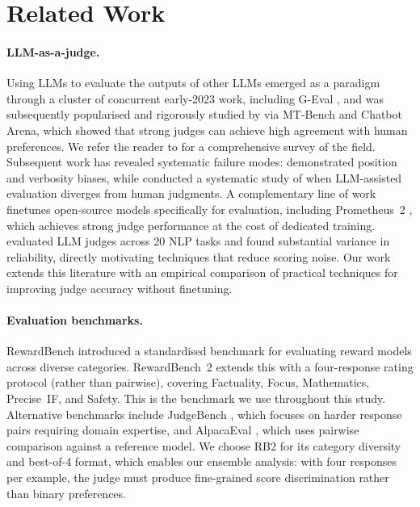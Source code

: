 \documentclass{article}
\begin{document}
\section{Related Work}
\label{sec:related-work}

\paragraph{LLM-as-a-judge.} Using LLMs to evaluate the outputs of other LLMs emerged as a paradigm through a cluster of concurrent early-2023 work, including G-Eval \citep{liu2023geval}, and was subsequently popularised and rigorously studied by \citet{zheng2023judging} via MT-Bench and Chatbot Arena, which showed that strong judges can achieve high agreement with human preferences. We refer the reader to \citet{gu2024survey} for a comprehensive survey of the field. Subsequent work has revealed systematic failure modes: \citet{wang2024large} demonstrated position and verbosity biases, while \citet{shankar2024validates} conducted a systematic study of when LLM-assisted evaluation diverges from human judgments. A complementary line of work finetunes open-source models specifically for evaluation, including Prometheus~2 \citep{kim2024prometheus}, which achieves strong judge performance at the cost of dedicated training. \citet{bavaresco2025judgebench} evaluated LLM judges across 20 NLP tasks and found substantial variance in reliability, directly motivating techniques that reduce scoring noise. Our work extends this literature with an empirical comparison of practical techniques for improving judge accuracy without finetuning.

\paragraph{Evaluation benchmarks.} RewardBench \citep{lambert2025rewardbench} introduced a standardised benchmark for evaluating reward models across diverse categories. RewardBench~2 \citep{malik2025rewardbench2} extends this with a four-response rating protocol (rather than pairwise), covering Factuality, Focus, Mathematics, Precise~IF, and Safety. This is the benchmark we use throughout this study. Alternative benchmarks include JudgeBench \citep{tan2025judgebench}, which focuses on harder response pairs requiring domain expertise, and AlpacaEval \citep{dubois2024alpacaeval}, which uses pairwise comparison against a reference model. We choose RB2 for its category diversity and best-of-4 format, which enables our ensemble analysis: with four responses per example, the judge must produce fine-grained score discrimination rather than binary preferences.
\end{document}

